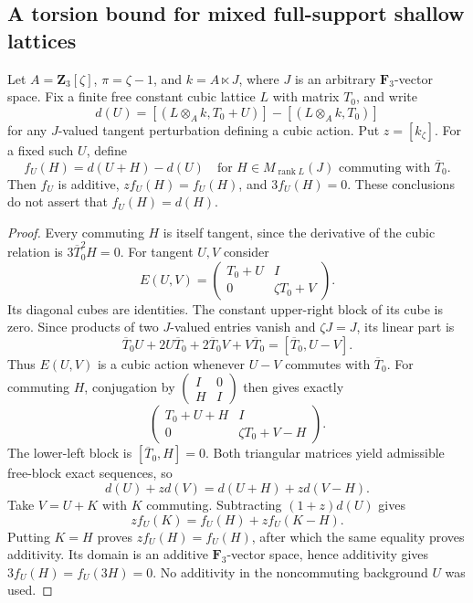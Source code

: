 \subsection{A torsion bound for mixed full-support shallow lattices}

\begin{lemma}
\label{C:shallow-commuting-translations}
Let $A=\mathbf Z_3[\zeta]$, $\pi=\zeta-1$, and
$k=A\ltimes J$, where $J$ is an arbitrary $\mathbf F_3$-vector
space.  Fix a finite free constant cubic lattice $L$ with
matrix $T_0$, and write
\[
 d(U)=[(L\otimes_Ak,T_0+U)]-[(L\otimes_Ak,T_0)]
\]
for any $J$-valued tangent perturbation defining a cubic action.
Put $z=[k_\zeta]$.  For a fixed such $U$, define
\[
 f_U(H)=d(U+H)-d(U)
 \quad\text{for }H\in M_{\operatorname{rank}L}(J)
          \text{ commuting with }\overline T_0.
\]
Then $f_U$ is additive, $z f_U(H)=f_U(H)$, and
$3f_U(H)=0$.
These conclusions do not assert that $f_U(H)=d(H)$.
\end{lemma}
\begin{proof}
Every commuting $H$ is itself tangent, since the derivative
of the cubic relation is $3\overline T_0^{2}H=0$.
For tangent $U,V$ consider
\[
 E(U,V)=\begin{pmatrix}T_0+U&I\\0&\zeta T_0+V\end{pmatrix}.
\]
Its diagonal cubes are identities.  The constant upper-right
block of its cube is zero.  Since products of two $J$-valued
entries vanish and $\zeta J=J$, its linear part is
\[
 \overline T_0U+2U\overline T_0
          +2\overline T_0V+V\overline T_0
       =[\overline T_0,U-V].
\]
Thus $E(U,V)$ is a cubic action whenever $U-V$ commutes
with $\overline T_0$.
For commuting $H$, conjugation by
$\left(\begin{smallmatrix}I&0\\H&I\end{smallmatrix}\right)$
then gives exactly
\[
 \begin{pmatrix}T_0+U+H&I\\0&\zeta T_0+V-H\end{pmatrix}.
\]
The lower-left block is $[\overline T_0,H]=0$.
Both triangular matrices yield admissible free-block exact
sequences, so
\[
 d(U)+z d(V)=d(U+H)+z d(V-H).                    \tag{C.1.MT1}
\]
Take $V=U+K$ with $K$ commuting.  Subtracting
$(1+z)d(U)$ gives
\[
 z f_U(K)=f_U(H)+z f_U(K-H).
\]
Putting $K=H$ proves $zf_U(H)=f_U(H)$, after which the
same equality proves additivity.  Its domain is an additive
$\mathbf F_3$-vector space, hence additivity gives
$3f_U(H)=f_U(3H)=0$.
No additivity in the noncommuting background $U$ was used.
\end{proof}

